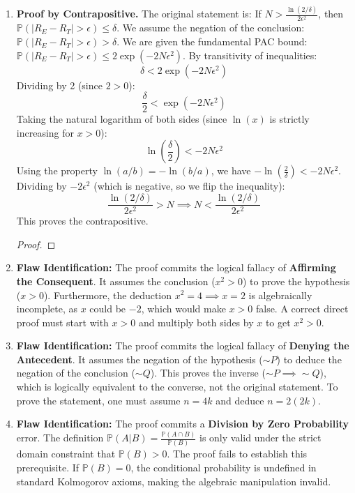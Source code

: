 \documentclass[11pt]{article}
\renewcommand{\qedsymbol}{$\blacksquare$}
\begin{document}
\begin{enumerate}
    \item \textbf{Proof by Contrapositive.} The original statement is: If $N > \frac{\ln(2/\delta)}{2\epsilon^2}$, then $\mathbb{P}(|R_E - R_T| > \epsilon) \le \delta$. We assume the negation of the conclusion: $\mathbb{P}(|R_E - R_T| > \epsilon) > \delta$. We are given the fundamental PAC bound: $\mathbb{P}(|R_E - R_T| > \epsilon) \le 2 \exp(-2N\epsilon^2)$. By transitivity of inequalities:
    \[ \delta < 2 \exp(-2N\epsilon^2) \]
    Dividing by 2 (since $2 > 0$):
    \[ \frac{\delta}{2} < \exp(-2N\epsilon^2) \]
    Taking the natural logarithm of both sides (since $\ln(x)$ is strictly increasing for $x > 0$):
    \[ \ln\left(\frac{\delta}{2}\right) < -2N\epsilon^2 \]
    Using the property $\ln(a/b) = -\ln(b/a)$, we have $-\ln\left(\frac{2}{\delta}\right) < -2N\epsilon^2$. Dividing by $-2\epsilon^2$ (which is negative, so we flip the inequality):
    \[ \frac{\ln(2/\delta)}{2\epsilon^2} > N \implies N < \frac{\ln(2/\delta)}{2\epsilon^2} \]
    This proves the contrapositive.
    \begin{proof}\renewcommand{\qedsymbol}{$\blacksquare$}\end{proof}

    \item \textbf{Flaw Identification:} The proof commits the logical fallacy of \textbf{Affirming the Consequent}. It assumes the conclusion ($x^2 > 0$) to prove the hypothesis ($x > 0$). Furthermore, the deduction $x^2 = 4 \implies x = 2$ is algebraically incomplete, as $x$ could be $-2$, which would make $x > 0$ false. A correct direct proof must start with $x > 0$ and multiply both sides by $x$ to get $x^2 > 0$.

    \item \textbf{Flaw Identification:} The proof commits the logical fallacy of \textbf{Denying the Antecedent}. It assumes the negation of the hypothesis ($\sim P$) to deduce the negation of the conclusion ($\sim Q$). This proves the inverse ($\sim P \implies \sim Q$), which is logically equivalent to the converse, not the original statement. To prove the statement, one must assume $n = 4k$ and deduce $n = 2(2k)$.

    \item \textbf{Flaw Identification:} The proof commits a \textbf{Division by Zero Probability} error. The definition $\mathbb{P}(A|B) = \frac{\mathbb{P}(A \cap B)}{\mathbb{P}(B)}$ is only valid under the strict domain constraint that $\mathbb{P}(B) > 0$. The proof fails to establish this prerequisite. If $\mathbb{P}(B) = 0$, the conditional probability is undefined in standard Kolmogorov axioms, making the algebraic manipulation invalid.


\end{enumerate}
\end{document}
